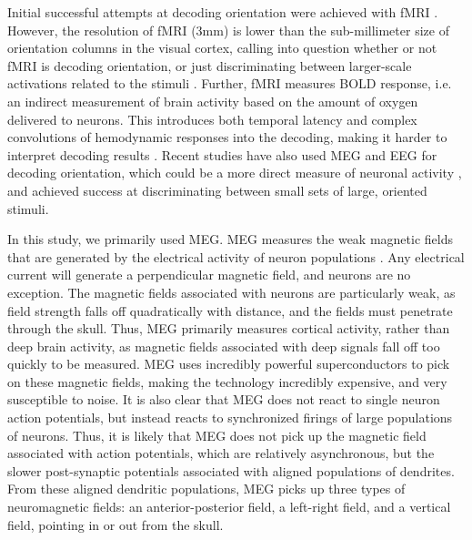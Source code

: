\documentclass[../main.tex]{subfiles}
\begin{document}
Initial successful attempts at decoding orientation were achieved with fMRI \citep{haynes_rees_2005, kamitani_tong_2005}. However, the resolution of fMRI (3mm) is lower than the sub-millimeter size of orientation columns in the visual cortex, calling into question whether or not fMRI is decoding orientation, or just discriminating between larger-scale activations related to the stimuli \citep{cichy_ramirez_pantazis_2015}. Further, fMRI measures BOLD response, i.e. an indirect measurement of brain activity based on the amount of oxygen delivered to neurons. This introduces both temporal latency and complex convolutions of hemodynamic responses into the decoding, making it harder to interpret decoding results \citep{cichy_ramirez_pantazis_2015}. Recent studies have also used MEG and EEG for decoding orientation, which could be a more direct measure of neuronal activity \citep{cichy_ramirez_pantazis_2015, pantazis_fang_qin_mohsenzadeh_li_cichy_2018, GARCIA2013515}, and achieved success at discriminating between small sets of large, oriented stimuli.

In this study, we primarily used MEG. MEG measures the weak magnetic fields that are generated by the electrical activity of neuron populations \citep{senior_russell_gazzaniga_2006}. Any electrical current will generate a perpendicular magnetic field, and neurons are no exception. The magnetic fields associated with neurons are particularly weak, as field strength falls off quadratically with distance, and the fields must penetrate through the skull. Thus, MEG primarily measures cortical activity, rather than deep brain activity, as magnetic fields associated with deep signals fall off too quickly to be measured. MEG uses incredibly powerful superconductors to pick on these magnetic fields, making the technology incredibly expensive, and very susceptible to noise. It is also clear that MEG does not react to single neuron action potentials, but instead reacts to synchronized firings of large populations of neurons. Thus, it is likely that MEG does not pick up the magnetic field associated with action potentials, which are relatively asynchronous, but the slower post-synaptic potentials associated with aligned populations of dendrites. From these aligned dendritic populations, MEG picks up three types of neuromagnetic fields: an anterior-posterior field, a left-right field, and a vertical field, pointing in or out from the skull.
\end{document}
